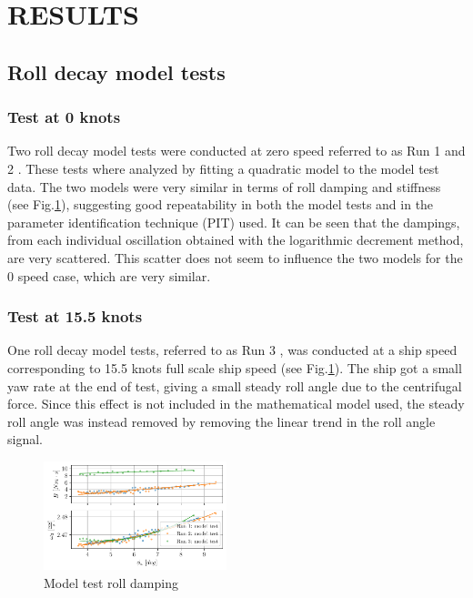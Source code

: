 \section*{RESULTS}\label{results}
\subsection*{Roll decay model tests}\label{roll-decay-model-tests}
\subsubsection*{Test at 0 knots}\label{test-at-0-knots}
Two roll decay model tests were conducted at zero speed referred to as
Run 1 and 2 \citep{7505983/5DP3HN8F}.
These tests where analyzed by fitting a quadratic model
to the model test data. The two models were very similar in terms of
roll damping and stiffness (see Fig.\ref{fig:mdl}), suggesting
good repeatability in both the model tests and in the parameter
identification technique (PIT) used. It can be seen that the dampings,
from each individual oscillation obtained with the logarithmic decrement
method, are very scattered. This scatter does not seem to influence the
two models for the 0 speed case, which are very similar.
\subsubsection*{Test at 15.5 knots}\label{test-at-15.5-knots}
One roll decay model tests, referred to as Run 3
\citep{7505983/5DP3HN8F}, was conducted at a ship speed corresponding to
15.5 knots full scale ship speed (see Fig.\ref{fig:mdl}). The
ship got a small yaw rate
at the end of test, giving a small steady roll angle due to the
centrifugal force. Since this effect is not included in the mathematical
model used, the steady roll angle was instead removed by removing the
linear trend in the roll angle signal.
\begin{figure}[H]
\begin{center}\includegraphics[width = 0.475\textwidth]{figures/mdl.pdf}\end{center}
\vspace{-0.7cm}
\caption{Model test roll damping}
\label{fig:mdl}
\end{figure}
